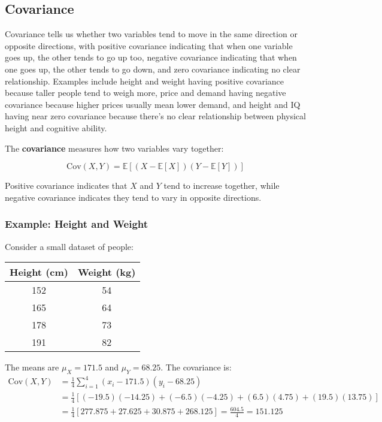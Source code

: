 \subsection{Covariance}

Covariance tells us whether two variables tend to move in the same direction or opposite directions, with positive covariance indicating that when one variable goes up, the other tends to go up too, negative covariance indicating that when one goes up, the other tends to go down, and zero covariance indicating no clear relationship. Examples include height and weight having positive covariance because taller people tend to weigh more, price and demand having negative covariance because higher prices usually mean lower demand, and height and IQ having near zero covariance because there's no clear relationship between physical height and cognitive ability.

The \textbf{covariance} measures how two variables vary together:

\begin{equation}
\text{Cov}(X, Y) = \mathbb{E}[(X - \mathbb{E}[X])(Y - \mathbb{E}[Y])]
\end{equation}

Positive covariance indicates that $X$ and $Y$ tend to increase together, while negative covariance indicates they tend to vary in opposite directions.

\subsubsection{Example: Height and Weight}

Consider a small dataset of people:
\begin{center}
\begin{tabular}{|c|c|}
\hline
Height (cm) & Weight (kg) \\
\hline
152 & 54 \\
165 & 64 \\
178 & 73 \\
191 & 82 \\
\hline
\end{tabular}
\end{center}

The means are $\mu_X = 171.5$ and $\mu_Y = 68.25$. The covariance is:
\begin{align}
\text{Cov}(X,Y) &= \frac{1}{4}\sum_{i=1}^{4}(x_i - 171.5)(y_i - 68.25) \\
&= \frac{1}{4}[(-19.5)(-14.25) + (-6.5)(-4.25) + (6.5)(4.75) + (19.5)(13.75)] \\
&= \frac{1}{4}[277.875 + 27.625 + 30.875 + 268.125] = \frac{604.5}{4} = 151.125
\end{align}

